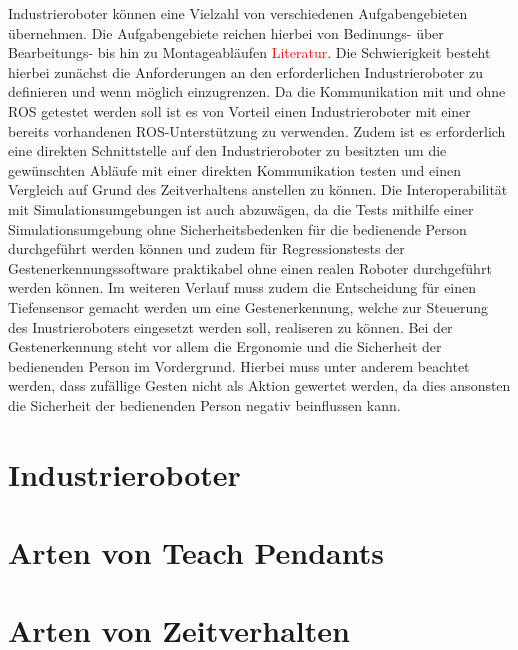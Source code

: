 
Industrieroboter können eine Vielzahl von verschiedenen Aufgabengebieten übernehmen. Die Aufgabengebiete reichen hierbei von Bedinungs- über Bearbeitungs- bis hin zu Montageabläufen \textcolor{red}{Literatur}. Die Schwierigkeit besteht hierbei zunächst die Anforderungen an den erforderlichen Industrieroboter zu definieren und wenn möglich einzugrenzen. Da die Kommunikation mit und ohne ROS getestet werden soll ist es von Vorteil einen Industrieroboter mit einer bereits vorhandenen ROS-Unterstützung zu verwenden. Zudem ist es erforderlich eine direkten Schnittstelle auf den Industrieroboter zu besitzten um die gewünschten Abläufe mit einer direkten Kommunikation testen und einen Vergleich auf Grund des Zeitverhaltens anstellen zu können. Die Interoperabilität mit Simulationsumgebungen ist auch abzuwägen, da die Tests mithilfe einer Simulationsumgebung ohne Sicherheitsbedenken für die bedienende Person durchgeführt werden können und zudem für Regressionstests der Gestenerkennungssoftware praktikabel ohne einen realen Roboter durchgeführt werden können. Im weiteren Verlauf muss zudem die Entscheidung für einen Tiefensensor gemacht werden um eine Gestenerkennung, welche zur Steuerung des Inustrieroboters eingesetzt werden soll, realiseren zu können. Bei der Gestenerkennung steht vor allem die Ergonomie und die Sicherheit der bedienenden Person im Vordergrund. Hierbei muss unter anderem beachtet werden, dass zufällige Gesten nicht als Aktion gewertet werden, da dies ansonsten die Sicherheit der bedienenden Person negativ beinflussen kann.


\section{Industrieroboter}


\section{Arten von Teach Pendants}


\section{Arten von Zeitverhalten}


